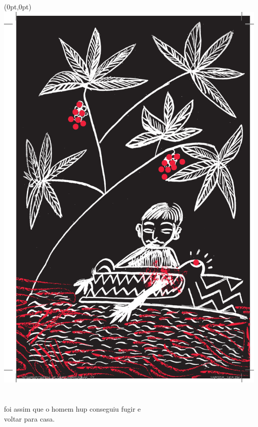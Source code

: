 \begin{textblock*}{8in}(0pt,0pt)%
\vspace*{-2.8cm}
\hspace*{-3.2cm}\includegraphics[width=153mm]{./imgs/img7.pdf}
\end{textblock*}

\chapter*{}

\mbox{}\vspace*{\fill}

 foi assim que
o homem hup
conseguiu fugir e\\
voltar para casa.

\medskip

